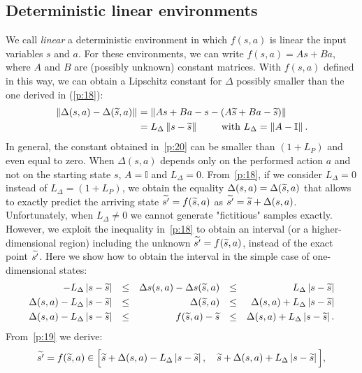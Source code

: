 \subsection{Deterministic linear environments}\label{app:b1}
\noindent We call \textit{linear} a deterministic environment in which $f(s, a)$ is linear \wrt the input variables $s$ and $a$. For these environments, we can write $f(s,a) = As + Ba$, where $A$ and $B$ are (possibly unknown) constant matrices. With $f(s,a)$ defined in this way, we can obtain a Lipschitz constant for $\Delta$ possibly smaller than the one derived in (\ref{p:18}):
\begin{align}
\left\|\Delta(s,a)-\Delta(\widetilde{s},a)\right\|_{} &= \left\|As+Ba-s - \left(A\widetilde{s}+Ba-\widetilde{s}\right)\right\|_{} \nonumber \\
&= L_{\Delta} \left\|s-\widetilde{s}\right\|_{} \qquad \text{ with } L_{\Delta}=\left\|A-\mathbb{I}\right\|_{}. \label{p:20}
\end{align}
In general, the constant obtained in~\eqref{p:20} can be smaller than $\left(1 + L_{P}\right)$ and even equal to zero. When $\Delta(s,a)$ depends only on the performed action $a$ and not on the starting state $s$,  $A=\mathbb{I}$ and $L_{\Delta}=0$. From~\eqref{p:18}, if we consider $L_{\Delta} = 0$ instead of $L_{\Delta} = \left(1 + L_{P}\right)$, we obtain the equality $\Delta(s,a) = \Delta(\widetilde{s}, a)$ that allows to exactly predict the arriving state $\widetilde{s'}=f(\widetilde{s}, a)$ as $\widetilde{s'} = \widetilde{s} + \Delta(s,a)$.\\
\newline
Unfortunately, when $L_{\Delta} \neq 0$ we cannot generate "fictitious" samples exactly. However, we exploit the inequality in~\eqref{p:18} to obtain an interval (or a higher-dimensional region) including the unknown $\widetilde{s'}=f(\widetilde{s},a)$, instead of the exact point $\widetilde{s'}$. Here we show how to obtain the interval in the simple case of one-dimensional states:
\begin{align}
-L_{\Delta} \left|s - \wt{s}\right| &&\leq&& \Delta s (s,a) - \Delta s (\wt{s},a) &&\leq&& L_{\Delta} \left|s - \wt{s}\right| \nonumber\\
%
\Delta(s,a) - L_{\Delta} \left|s - \wt{s}\right| &&\leq&& \Delta(\wt{s},a) &&\leq&& \Delta(s,a) + L_{\Delta} \left|s - \wt{s}\right| \nonumber\\
%
\Delta(s,a) - L_{\Delta} \left|s - \wt{s}\right| &&\leq&& f(\wt{s},a) - \wt{s} &&\leq&& \Delta(s,a) + L_{\Delta} \left|s - \wt{s}\right|. \label{p:19}
\end{align}
From~\eqref{p:19} we derive:
\begin{align}
	\widetilde{s'}=f(\widetilde{s}, a) \in \Big[\widetilde{s} + \Delta(s,a) - L_{\Delta} \left|s - \widetilde{s}\right|, \quad \widetilde{s} + \Delta(s,a) + L_{\Delta} \left|s - \widetilde{s}\right|\Big],
\end{align}
